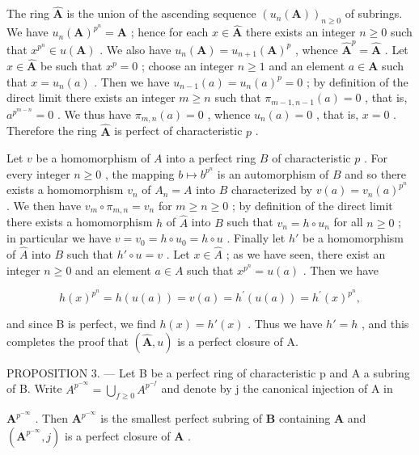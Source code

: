 The ring \(\hat{\mathbf{A}}\) is the union of the ascending sequence \((u_n(\mathbf{A}))_{n\geq 0}\) of subrings. We have \(u_{n}(\mathbf{A})^{p^{n}} = \mathbf{A}\) ; hence for each \(x\in \hat{\mathbf{A}}\) there exists an integer \(n\geqslant 0\) such that \(x^{p^n}\in u(\mathbf{A})\) . We also have \(u_{n}(\mathbf{A}) = u_{n + 1}(\mathbf{A})^{p}\) , whence \(\hat{\mathbf{A}}^p = \hat{\mathbf{A}}\) . Let \(x\in \hat{\mathbf{A}}\) be such that \(x^{p} = 0\) ; choose an integer \(n\geqslant 1\) and an element \(a\in \mathbf{A}\) such that \(x = u_{n}(a)\) . Then we have \(u_{n - 1}(a) = u_n(a)^p = 0\) ; by definition of the direct limit there exists an integer \(m\geqslant n\) such that \(\pi_{m - 1,n - 1}(a) = 0\) , that is, \(a^{p^{m - n}} = 0\) . We thus have \(\pi_{m,n}(a) = 0\) , whence \(u_{n}(a) = 0\) , that is, \(x = 0\) . Therefore the ring \(\hat{\mathbf{A}}\) is perfect of characteristic \(p\) .

Let \(v\) be a homomorphism of \(A\) into a perfect ring \(B\) of characteristic \(p\) . For every integer \(n \geqslant 0\) , the mapping \(b \mapsto b^{p^n}\) is an automorphism of \(B\) and so there exists a homomorphism \(v_n\) of \(A_n = A\) into \(B\) characterized by \(v(a) = v_n(a)^{p^n}\) . We then have \(v_m \circ \pi_{m,n} = v_n\) for \(m \geqslant n \geqslant 0\) ; by definition of the direct limit there exists a homomorphism \(h\) of \(\hat{A}\) into \(B\) such that \(v_n = h \circ u_n\) for all \(n \geqslant 0\) ; in particular we have \(v = v_0 = h \circ u_0 = h \circ u\) . Finally let \(h'\) be a homomorphism of \(\hat{A}\) into \(B\) such that \(h' \circ u = v\) . Let \(x \in \hat{A}\) ; as we have seen, there exist an integer \(n \geqslant 0\) and an element \(a \in A\) such that \(x^{p^n} = u(a)\) . Then we have

\[
h (x) ^ {p ^ {n}} = h (u (a)) = v (a) = h ^ {\prime} (u (a)) = h ^ {\prime} (x) ^ {p ^ {n}},
\]

and since B is perfect, we find \(h(x) = h'(x)\) . Thus we have \(h' = h\) , and this completes the proof that \((\hat{\mathbf{A}}, u)\) is a perfect closure of A.

PROPOSITION 3. --- Let B be a perfect ring of characteristic p and A a subring of B. Write \(A^{p^{-\infty}} = \bigcup_{f \geqslant 0} A^{p^{-f}}\) and denote by j the canonical injection of A in

\(\mathbf{A}^{p^{-\infty}}\) . Then \(\mathbf{A}^{p^{-\infty}}\) is the smallest perfect subring of \(\mathbf{B}\) containing \(\mathbf{A}\) and \((\mathbf{A}^{p^{-\infty}}, j)\) is a perfect closure of \(\mathbf{A}\) .

